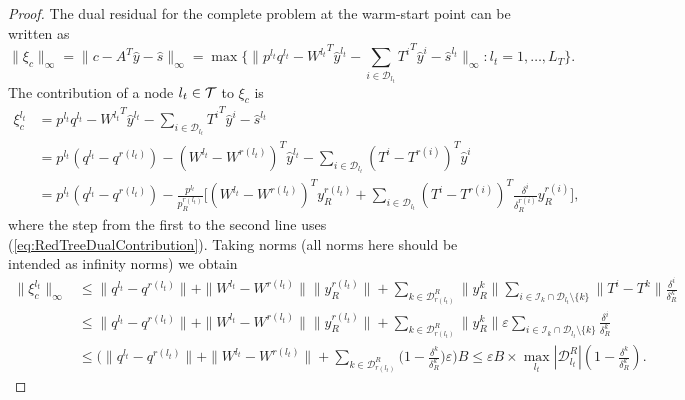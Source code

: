\begin{proof}
The dual residual for the complete problem at the warm-start point 
can be written as
\[
  \|\xi_c\|_\infty = \|c -A^T\hat y -\hat s \|_\infty 
                   = \max\{\|p^{l_t}q^{l_t}
                   - {W^{l_t}}^T\hat y^{l_t} 
                   - \sum_{i \in \mathcal{D}_{l_t}} {T^{i}}^T\hat y^{i}
                   - \hat s^{l_t}
  \|_\infty : l_t = 1,\ldots,L_T\}.
\]
%
The contribution of a node $l_t \in \mathcal{T}$ to $\xi_c$ is
\[
\begin{split}
  \xi_c^{l_t} 
 & = p^{l_t} q^{l_t} - {W^{l_t}}^T\hat y^{l_t}
     - \sum_{i\in \mathcal{D}_{l_t}} {T^i}^T \!\hat y^{i} -\hat s^{l_t} \\
 & = p^{l_t}(q^{l_t}\!-\! q^{r(l_t)})
     - (W^{l_t} \!-\! W^{r(l_t)})^T \hat y^{l_t}
     -\sum_{i \in \mathcal{D}_{l_t}} (T^{i} \!-\! T^{r(i)})^T\hat y^i \\
 & = p^{l_t}(q^{l_t} \!-\! q^{r(l_t)})
     - \frac{p^{l_t}}{p^{r(l_t)}_R} \Big[
       (W^{l_t} \!-\! W^{r(l_t)})^T y^{r(l_t)}_R
       +\sum_{i\in \mathcal{D}_{l_t}} %
           (T^{i} \!-\! T^{r(i)})^T 
           \frac{\delta^i}{\delta^{r(i)}_R} y^{r(i)}_R \Big],
\end{split}
\]
where the step from the first to the second line uses 
(\ref{eq:RedTreeDualContribution}).
%
Taking norms (all norms here should be intended as infinity norms)
we obtain
\[
\begin{split}
  \| \xi_c^{l_t} \|_\infty
  & \le \|q^{l_t} - q^{r(l_t)}\| 
        + \|W^{l_t} - W^{r(l_t)}\| \| y^{r(l_t)}_R\|
        + \!\!\! \sum_{k\in \mathcal{D}_{r(l_t)}^R} \!\!\! \| y^{k}_R \| \!\!
          \sum_{i\in \mathcal{I}_k \cap \mathcal{D}_{l_t}\setminus \{k\} }
	  \!\!\! \| T^{i} - T^{k} \| \frac{\delta^i}{\delta_R^k} \\
  & \le \|q^{l_t} - q^{r(l_t)}\| 
        + \|W^{l_t} - W^{r(l_t)}\| \| y^{r(l_t)}_R\|
        + \!\!\! \sum_{k\in \mathcal{D}_{r(l_t)}^R} \!\!\! \| y^{k}_R \|
          \varepsilon \!\!
          \sum_{i\in \mathcal{I}_k \cap \mathcal{D}_{l_t}\setminus \{k\} }
	  \! \frac{\delta^i}{\delta_R^k} \\
  & \le \Big( \|q^{l_t} - q^{r(l_t)}\| 
        + \|W^{l_t} - W^{r(l_t)}\|
        + \sum_{k\in \mathcal{D}_{r(l_t)}^R}
	  \big( 1 - \frac{\delta^k}{\delta_R^k} \big) \varepsilon \Big) B 
   \le \varepsilon B\times 
        \max_{l_t} |\mathcal{D}_{l_t}^R| (1 - \frac{\delta^k}{\delta^k_R}).
\end{split}
\]
%
\end{proof}

